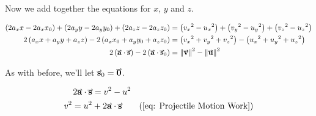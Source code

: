 \documentclass[main.tex]{subfiles}
\begin{document}
                \begin{center}
                    Now we add together the equations for $x$, $y$ and $z$.
                \end{center}

                \begin{align*}
                    \left(2a_x x - 2a_x x_0\right) + \left(2a_y y - 2a_y y_0\right) + \left(2a_z z - 2a_z z_0\right) &= \left({v_x}^2 - {u_x}^2\right) + \left({v_y}^2 - {u_y}^2\right) + \left({v_z}^2 - {u_z}^2\right)\\
                    2\left(a_x x + a_y y + a_z z\right) - 2\left(a_x x_0 + a_y y_0 + a_z z_0\right) & = \left({v_x}^2 + {v_y}^2 + {v_z}^2\right) - \left({u_x}^2 + {u_y}^2 + {u_z}^2\right)\\
                    2\left(\vect{a} \cdot \vect{s}\right) - 2\left(\vect{a} \cdot \vect{s}_0\right) &= \vmod{\vect{v}}^2 - \vmod{\vect{u}}^2
                \end{align*}
                \vspace{2em}

                \begin{center}
                    As with before, we'll let $\vect{s}_0 = \vect{0}$.
                \end{center}
                
                \begin{align*}
                    2\vect{a}\cdot\vect{s} &= v^2 - u^2\\
                    v^2 = u^2 &+ 2\vect{a}\cdot\vect{s} \tag{\eqnum{eq: Projectile Motion Work}}
                \end{align*}


                
\end{document}
